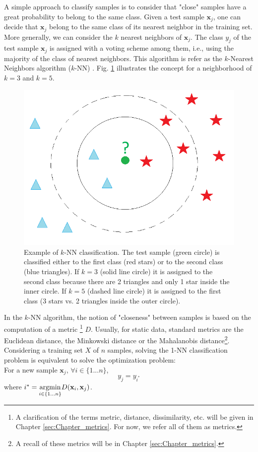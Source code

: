 A simple approach to classify samples is to consider that "close" samples have a great probability to belong to the same class. Given a test sample $\textbf{x}_j$, one can decide that $\textbf{x}_j$ belong to the same class of its nearest neighbor in the training set. More generally, we can consider the $k$ nearest neighbors of $\textbf{x}_j$. The class $y_j$ of the test sample $\textbf{x}_j$ is assigned with a voting scheme among them, i.e., using the majority of the class of nearest neighbors. This algorithm is refer as the $k$-Nearest Neighbors algorithm ($k$-NN) 
\cite{Cover1967b,Duda1973}. Fig. \ref{fig:kNN_example} illustrates the concept for a neighborhood of $k=3$ and $k=5$.

\begin{figure}[h!]
\centering
\includegraphics[width=0.4\linewidth]{images/kNN_example}
\caption{Example of $k$-NN classification. The test sample (green circle) is classified either to the first class (red stars) or to the second class (blue triangles). If $k = 3$ (solid line circle) it is assigned to the second class because there are 2 triangles and only 1 star inside the inner circle. If $k = 5$ (dashed line circle) it is assigned to the first class (3 stars vs. 2 triangles inside the outer circle).}
\label{fig:kNN_example}
\end{figure}

\noindent In the $k$-NN algorithm, the notion of "closeness" between samples is based on the computation of a metric \footnote{A clarification of the terms metric, distance, dissimilarity, etc. will be given in Chapter \ref{sec:Chapter_metrics}. For now, we refer all of them as metrics.} $D$. Usually, for static data, standard metrics are the Euclidean distance, the Minkowski distance or the Mahalanobis distance\footnote{A recall of these metrics will be in Chapter \ref{sec:Chapter_metrics}.}. Considering a training set $X$ of $n$ samples, solving the 1-NN classification problem is equivalent to solve the optimization problem: \\
\noindent For a new sample $\textbf{x}_j$, $\forall i \in \{1...n\}$,
\begin{equation}
y_j = y_{i^*}
\end{equation}
where $i^*={\underset{i \in \{1...n\}}{\argmin}   D(\textbf{x}_i,\textbf{x}_j)}$.

